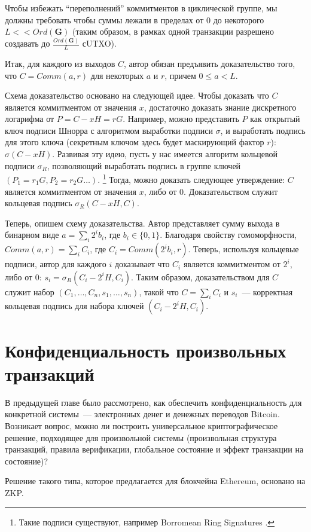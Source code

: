 \documentclass{article}
\begin{document}
Чтобы избежать ``переполнений'' коммитментов в циклической группе,
мы должны требовать чтобы суммы лежали в пределах от $0$ до некоторого
$L << Ord(\mathbf{G})$
 (таким образом, в рамках одной транзакции разрешено создавать до $\frac{Ord(\mathbf{G})}{L}$ сUTXO).

Итак, для каждого из выходов $C$, автор обязан предъявить доказательство того,
что $C = Comm(a, r)$ для некоторых $a$ и $r$, причем $0 \le a < L$.

Схема доказательство основано на следующей идее.
Чтобы доказать что $C$ является коммитментом от значения $x$,
достаточно доказать знание дискретного логарифма от $P = C - xH = rG$.
Например, можно представить $P$ как открытый ключ подписи Шнорра
с алгоритмом выработки подписи $\sigma$,
и выработать подпись для этого ключа (секретным ключом здесь будет маскирующий фактор $r$):
$\sigma(C-xH)$. Развивая эту идею, пусть у нас имеется алгоритм кольцевой подписи $\sigma_R$,
 позволяющий выработать подпись в группе ключей $(P_1 = r_1G, P_2 = r_2G \ldots)$.
 \footnote{Такие подписи существуют, например Borromean Ring Signatures \cite{Borromean}.}
Тогда, можно доказать следующее утверждение:
$C$ является коммитментом от значения $x$, либо от $0$.
Доказательством служит кольцевая подпись $\sigma_R(C - xH, C)$.

Теперь, опишем схему доказательства.
Автор представляет сумму выхода в бинарном виде $a = \sum_{i} 2^ib_i$,
где $b_i \in \{0,1\}$. Благодаря свойству гомоморфности,
$Comm(a, r) = \sum_{i} C_i$, где $C_i = Comm(2^ib_i, r)$.
Теперь,  используя кольцевые подписи, автор для каждого $i$
доказывает что $C_i$ является коммитментом от $2^i$, либо от $0$: $s_i = \sigma_R(C_i-2^iH, C_i)$.
Таким образом, доказательством для $C$ служит набор $(C_1,\ldots, C_n, s_1, \ldots, s_n)$,
такой что $C = \sum_{i} C_i$ и $s_i$~--- корректная кольцевая подпись для набора ключей $(C_i - 2^iH, C_i)$.


\section{Конфиденциальность произвольных транзакций}

В предыдущей главе было рассмотрено, как обеспечить конфиденциальность для
конкретной системы~--- электронных денег и денежных переводов Bitcoin.
Возникает вопрос, можно ли построить универсальное криптографическое решение,
подходящее для произвольной системы (произвольная структура транзакций, правила верификации,
глобальное состояние и
эффект транзакции на состояние)?

Решение такого типа, которое предлагается для блокчейна Ethereum,
 основано на ZKP.



\end{document}
